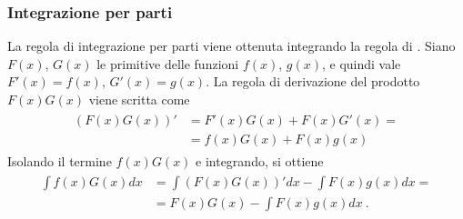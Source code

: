 \documentclass[letterpaper,10pt,english]{jupyterBook}
\begin{document}
\subsubsection{Integrazione per parti}
\label{\detokenize{ch/infinitesimal_calculus/integrals:integrazione-per-parti}}\label{\detokenize{ch/infinitesimal_calculus/integrals:infinitesimal-calculus-integrals-by-parts}}
\sphinxAtStartPar
La regola di integrazione per parti viene ottenuta integrando la regola di {\hyperref[\detokenize{ch/infinitesimal_calculus/derivatives:equation-infinitesimal-calculus-derivatives-rules-product}]{}}. Siano \(F(x)\), \(G(x)\) le primitive delle funzioni \(f(x)\), \(g(x)\), e quindi vale \(F'(x) = f(x)\), \(G'(x) = g(x)\).
La regola di derivazione del prodotto \(F(x)G(x)\) viene scritta come
\begin{equation*}
\begin{split}\begin{aligned}
  (F(x) G(x))' & = F'(x) G(x) + F(x) G'(x) = \\
  & = f(x) G(x) + F(x) g(x)
\end{aligned}\end{split}
\end{equation*}
\sphinxAtStartPar
Isolando il termine \(f(x)G(x)\) e integrando, si ottiene
\begin{equation*}
\begin{split}\begin{aligned}
\int f(x) G(x) dx & = \int (F(x) G(x))' dx - \int F(x) g(x) dx = \\
& = F(x) G(x) - \int F(x) g(x) dx  \ .
\end{aligned}\end{split}
\end{equation*}
\end{document}

